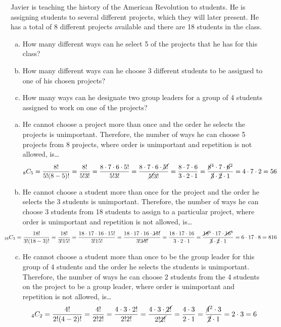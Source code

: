\documentclass[11pt,letterpaper]{article}
\begin{document}
\newpage



 Javier is teaching the history of the American Revolution to students. He is assigning students to several different projects, which they will later present. He has a total of 8 different projects available and there are 18 students in the class.
	\begin{enumerate}[(a)]
	\item How many different ways can he select 5 of the projects that he has for this class?
	\item How many different ways can he choose 3 different students to be assigned to one of his chosen projects?
	\item How many ways can he designate two group leaders for a group of 4 students assigned to work on one of the projects?
	\end{enumerate} \pspace

\sol 
\begin{enumerate}[(a)]
\item He cannot choose a project more than once and the order he selects the projects is unimportant. Therefore, the number of ways he can choose 5 projects from 8 projects, where order is unimportant and repetition is not allowed, is\dots
	\[
	_8C_5= \dfrac{8!}{5! (8 - 5)!}= \dfrac{8!}{5! 3!}= \dfrac{8 \cdot 7 \cdot 6 \cdot 5!}{5! 3!}= \dfrac{8 \cdot 7 \cdot 6 \cdot \cancel{5!}}{\cancel{5!} 3!}= \dfrac{8 \cdot 7 \cdot 6}{3 \cdot 2 \cdot 1}= \dfrac{\cancel{8}^4 \cdot 7 \cdot \cancel{6}^2}{\cancel{3} \cdot \cancel{2} \cdot 1}= 4 \cdot 7 \cdot 2= 56
	\] \pspace

\item He cannot choose a student more than once for the project and the order he selects the 3 students is unimportant. Therefore, the number of ways he can choose 3 students from 18 students to assign to a particular project, where order is unimportant and repetition is not allowed, is\dots
	\[
	\hspace{-1.2cm} _{18}C_3= \dfrac{18!}{3! (18 - 3)!}= \dfrac{18!}{3! 15!}= \dfrac{18 \cdot 17 \cdot 16 \cdot 15!}{3! 15!}= \dfrac{18 \cdot 17 \cdot 16 \cdot \cancel{15!}}{3! \cancel{15!}}= \dfrac{18 \cdot 17 \cdot 16}{3 \cdot 2 \cdot 1}= \dfrac{\cancel{18}^6 \cdot 17 \cdot \cancel{16}^8}{\cancel{3} \cdot \cancel{2} \cdot 1}= 6 \cdot 17 \cdot 8= 816
	\] \pspace
 
\item He cannot choose a student more than once to be the group leader for this group of 4 students and the order he selects the students is unimportant. Therefore, the number of ways he can choose 2 students from the 4 students on the project to be a group leader, where order is unimportant and repetition is not allowed, is\dots 
	\[
	_4C_2= \dfrac{4!}{2! (4 - 2)!}= \dfrac{4!}{2! 2!}= \dfrac{4 \cdot 3 \cdot 2!}{2! 2!}= \dfrac{4 \cdot 3 \cdot \cancel{2!}}{2! \cancel{2!}}= \dfrac{4 \cdot 3}{2 \cdot 1}= \dfrac{\cancel{4}^2 \cdot 3}{\cancel{2} \cdot 1}= 2 \cdot 3= 6
	\]
\end{enumerate}
\end{document}
